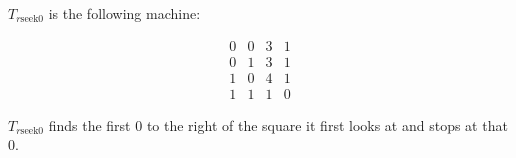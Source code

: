 $T_{r\text{seek}0}$ is the following machine:

$$\begin{array}{cccc}
0 & 0 & 3 & 1 \\
0 & 1 & 3 & 1 \\
1 & 0 & 4 & 1 \\
1 & 1 & 1 & 0
\end{array}$$

$T_{r\text{seek}0}$ finds the first $0$ to the right of the square it first looks at and stops at that $0$.
